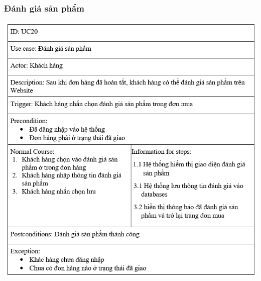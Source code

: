 \documentclass[12pt,a4paper,2sides]{report}
\begin{document}
\subsubsection{Đánh giá sản phẩm}
    \includegraphics[width=1\linewidth]{lib/usecase/danhgiasp.png}\\\vspace*{1cm}    
\end{document}
